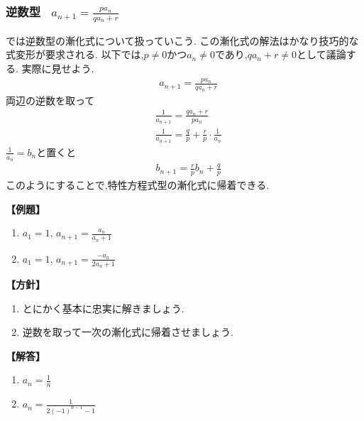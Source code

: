 
\subsubsection{逆数型  \, $\displaystyle a_{n+1}=\frac{pa_n}{qa_n+r}$}
    では逆数型の漸化式について扱っていこう.
    この漸化式の解法はかなり技巧的な式変形が要求される.
    以下では,$p\ne0$かつ$a_n\ne0$であり,$qa_n+r\ne0$として議論する.
    実際に見せよう.
    \begin{align*}
      &a_{n+1}=\frac{pa_n}{qa_n+r}
    \end{align*}
      両辺の逆数を取って
    \begin{align*}
      &\frac{1}{a_{n+1}}=\frac{qa_n+r}{pa_n}\\
      &\frac{1}{a_{n+1}}=\frac{q}{p}+\frac{r}{p}\cdot\frac{1}{a_n}
    \end{align*}
    $\displaystyle \frac{1}{a_n}=b_n$と置くと
    \begin{align*}
      &b_{n+1}=\frac{r}{p}b_n+\frac{q}{p}
    \end{align*}
    このようにすることで,特性方程式型の漸化式に帰着できる.

    \noindent \textbf{【例題】}
    \begin{enumerate}[label=(\arabic*),parsep=3pt]
      \item $\displaystyle a_1=1,\, a_{n+1}=\frac{a_n}{a_n+1}$
      \item $\displaystyle a_1=1,\, a_{n+1}=\frac{-a_n}{2a_n+1}$
    \end{enumerate}

    \noindent\textbf{【方針】}
    \begin{enumerate}[label=(\arabic*),parsep=3pt]
      \item とにかく基本に忠実に解きましょう.
      \item 逆数を取って一次の漸化式に帰着させましょう.
    \end{enumerate}

    \noindent\textbf{【解答】}
    \begin{enumerate}[label=(\arabic*),parsep=3pt]
      \item $\displaystyle a_n=\frac{1}{n}$
      \item $\displaystyle a_n=\frac{1}{2(-1)^{n-1}-1}$
    \end{enumerate}


